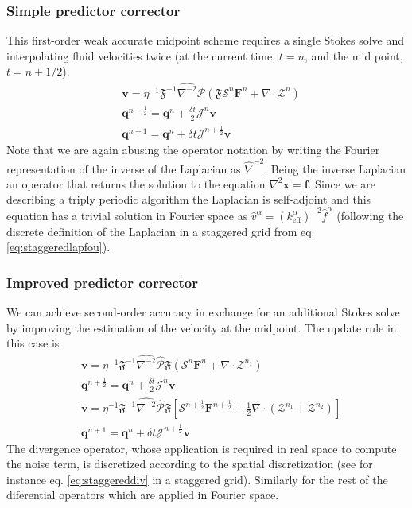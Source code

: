\documentclass[ twoside,openright,titlepage,numbers=noenddot,%
headinclude,footinclude,cleardoublepage=empty,abstract=on,
BCOR=5mm,paper=a4,fontsize=11pt, dvipsnames
]{scrreprt}
\renewcommand{\vec}[1]{\bm{#1}}
\newcommand{\oper}[1]{\mathcal{#1}}
\newcommand{\dt}{\delta t}
\newcommand{\half}{\frac{1}{2}}
\newcommand{\fou}[1]{\widehat{#1}}
\newcommand{\ppos}{q}
\newcommand{\fvel}{v}
\begin{document}
\subsubsection*{Simple predictor corrector}
This first-order weak accurate midpoint scheme requires a single Stokes solve and interpolating fluid velocities twice (at the current time, $t=n$, and the mid point, $t=n+1/2$).
\begin{equation}
  \begin{aligned}
    &\vec{\fvel} = \eta^{-1}\mathfrak{F}^{-1}\fou{\nabla^{-2}}\fou{\oper{P}}(\mathfrak{F}\oper{S}^{n}\vec{F}^{n} + \nabla\cdot\mathcal{Z}^{n})\\
    &\vec{\ppos}^{n+\half} = \vec{\ppos}^n + \frac{\dt}{2}\oper{J}^n\vec{\fvel}\\
    &\vec{\ppos}^{n+1} = \vec{\ppos}^n + \dt\oper{J}^{n+\half}\vec{\fvel}
  \end{aligned}
\end{equation}
Note that we are again abusing the operator notation by writing the Fourier representation of the inverse of the Laplacian as $\fou\nabla^{-2}$. Being the inverse Laplacian an operator that returns the solution to the equation $\nabla^2\vec{x} = \vec{f}$. Since we are describing a triply periodic algorithm the Laplacian is self-adjoint and this equation has a trivial solution in Fourier space as $\fou{v}^\alpha = \left(k_{\text{eff}}^\alpha\right)^{-2}\fou{f}^\alpha$ (following the discrete definition of the Laplacian in a staggered grid from eq. \eqref{eq:staggeredlapfou}).
\subsubsection*{Improved predictor corrector}
We can achieve second-order accuracy in exchange for an additional Stokes solve by improving the estimation of the velocity at the midpoint. The update rule in this case is 
\begin{equation}
  \begin{aligned}
    &\vec{\fvel} = \eta^{-1}\mathfrak{F}^{-1}\fou{\nabla^{-2}}\fou{\oper{P}}\mathfrak{F}(\oper{S}^{n}\vec{F}^{n} + \nabla\cdot\mathcal{Z}^{n_1})\\
    &\vec{\ppos}^{n+\half} = \vec{\ppos}^n + \frac{\dt}{2}\oper{J}^n\vec{\fvel}\\
    &\tilde{\vec{\fvel}}= \eta^{-1}\mathfrak{F}^{-1}\fou{\nabla^{-2}}\fou{\oper{P}}\mathfrak{F}\left[\oper{S}^{n+\half}\vec{F}^{n+\half} + \half\nabla\cdot\left(\mathcal{Z}^{n_1} +  \mathcal{Z}^{n_2}\right)\right]\\
    &\vec{\ppos}^{n+1}= \vec{\ppos}^n + \dt\oper{J}^{n+\half}\tilde{\vec{\fvel}}
  \end{aligned}      
\end{equation}
The divergence operator, whose application is required in real space to compute the noise term, is discretized according to the spatial discretization (see for instance eq. \eqref{eq:staggereddiv} in a staggered grid). Similarly for the rest of the diferential operators which are applied in Fourier space.
\end{document}
